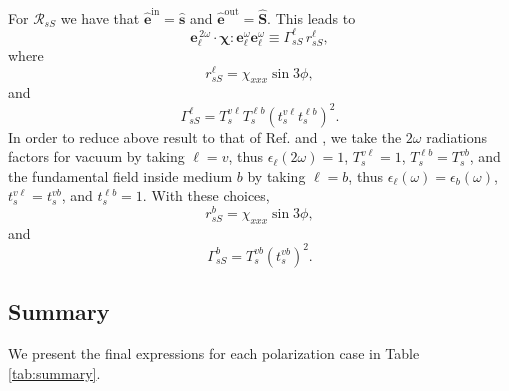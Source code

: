 For $\mathcal{R}_{sS}$ we have that
$\hat{\mathbf{e}}^{\mathrm{in}}=\hat{\mathbf{s}}$ and
$\hat{\mathbf{e}}^{\mathrm{out}}=\hat{\mathbf{S}}$. This leads to
\begin{equation*}
\mathbf{e}^{\,2\omega}_{\ell}\cdot
\boldsymbol{\chi}:\mathbf{e}^\omega_{\ell}\mathbf{e}^\omega_{\ell}
\equiv\Gamma^{\ell}_{sS}\, r^{\ell}_{sS},
\end{equation*}
where
\begin{equation}
r^{\ell}_{sS} = \chi_{xxx}\sin3\phi,
\end{equation}
and
\begin{equation}
\Gamma^{\ell}_{sS}=
T^{v\ell}_{s}T^{\ell b}_{s}\left(t^{v\ell}_{s}t^{\ell b}_{s}\right)^{2}.
\end{equation} 
In order to reduce above result to that of Ref. \cite{mizrahiJOSA88} and
\cite{sipePRB87}, we take the $2\omega$ radiations factors for vacuum by
taking $\ell=v$, thus $\epsilon_{\ell}(2\omega)=1$, $T^{v\ell}_{s}=1$,
$T^{\ell b}_{s}=T^{vb}_{s}$, and the fundamental field inside medium $b$ by
taking $\ell=b$, thus $\epsilon_{\ell}(\omega)=\epsilon_{b}(\omega)$,
$t^{v\ell}_{s}=t^{vb}_{s}$, and $t^{\ell b}_{s}=1$. With these choices,
\begin{equation*}
r^{b}_{sS} = \chi_{xxx}\sin3\phi,
\end{equation*}
and 
\begin{equation*}
\Gamma^{b}_{sS} = T^{vb}_{s}\left(t^{vb}_{s}\right)^{2}.
\end{equation*} 


\subsection{Summary}

We present the final expressions for each polarization case in Table
\ref{tab:summary}.


